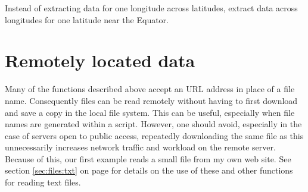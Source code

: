 \documentclass[krantz2]{krantz}\usepackage{knitr}
\begin{document}
\begin{knitrout}\footnotesize
{}\color{fgcolor}
\end{knitrout}

\begin{playground}
Instead of extracting data for one longitude across latitudes, extract data across longitudes for one latitude near the Equator.
\end{playground}

\section{Remotely located data}\label{sec:files:remote}

Many of the functions described above accept an URL address in place of a file name. Consequently files can be read remotely without having to first download and save a copy in the local file system. This can be useful, especially when file names are generated within a script. However, one should avoid, especially in the case of servers open to public access, repeatedly downloading the same file as this unnecessarily increases network traffic and workload on the remote server. Because of this, our first example reads a small file from my own web site. See section \ref{sec:files:txt} on page \pageref{sec:files:txt} for details on the use of these and other functions for reading text files.
\end{document}
